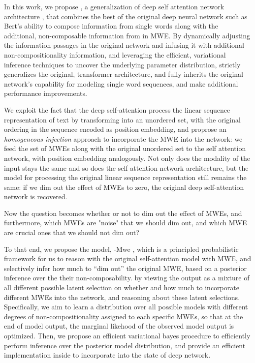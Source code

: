 In this work, 
we propose \BertMWE, a generalization of deep self attention network architecture \cite{vaswani2017attention}, 
that combines the best of the original deep neural network such as Bert's ability to compose information from single words \cite{devlin2018bert} along with the additional, non-composable information from in MWE.
By dynamically adjusting the information passages in the original network and infusing it with additional non-compositionality information, 
and leveraging the efficient, variational inference techniques to uncover the underlying parameter distribution, 
\BertMWE strictly generalizes the original, transformer architecture, and fully inherits the original network's capability for modeling single word sequences, and make additional performance improvements.

We exploit the fact that the deep self-attention process the linear sequence representation of text by transforming into an unordered set, with the original ordering in the sequence encoded as position embedding,
and proprose an \textit{homogeneous injection} approach to incorporate the MWE into the network:
we feed the set of MWEs along with the original unordered set to the self attention network, with position embedding analogously.
Not only does the modality of the input stays the same and so does the self attention network architecture,
but the model for processing the original linear sequence representation still remains the same: if we dim out the effect of MWEs to zero, the original deep self-attention network is recovered.

Now the question becomes whether or not to dim out the effect of MWEs, and furthermore, which MWEs are "noise" that  we should dim out, and which MWE are crucial ones that we should not dim out?

To that end, we propose the model, \Bert-Mwe , 
which is a principled probabilistic framework  for us to reason with the original self-attention model with MWE, and selectively infer how much to “dim out” the original MWE, based on a posterior inference over the their non-composability.
by viewing the output as a mixture of all different possible latent selection on whether and how much to incorporate different MWEs into the network, and reasoning about these latent selections.
Specifically, we aim to learn a distribution over all possible models  with different degrees of non-compositionality assigned to each specific MWEs,  so that at the end of model output, the marginal likehood of the observed model output is optimized.
Then, we propose an efficient variational bayes procedure  to efficiently perform inference over the posterior model distribution, and provide an efficient implementation inside to incorporate into the state of deep  network. 


